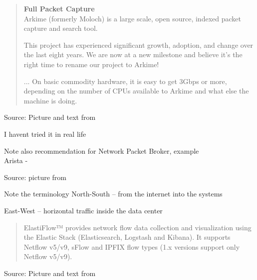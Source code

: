 \documentclass[Screen16to9,17pt]{foils}
\begin{document}


\begin{quote}\small
{\bf Full Packet Capture}\\
Arkime (formerly Moloch) is a large scale, open source, indexed packet capture and search tool.

This project has experienced significant growth, adoption, and change over the last eight years. We are now at a new milestone and believe it’s the right time to rename our project to Arkime!

...
On basic commodity hardware, it is easy to get 3Gbps or more, depending on the number of CPUs available to Arkime and what else the machine is doing.
\end{quote}
Source: Picture and text from 

\begin{list2}
\item I havent tried it in real life
\item Note also recommendation for Network Packet Broker, example\\
Arista - 
\end{list2}





Source: picture from 

\begin{list2}
\item Note the terminology North-South -- from the internet into the systems
\item East-West -- horizontal traffic inside the data center
\end{list2}





\begin{quote}
  ElastiFlow™ provides network flow data collection and visualization using the Elastic Stack (Elasticsearch, Logstash and Kibana). It supports Netflow v5/v9, sFlow and IPFIX flow types (1.x versions support only Netflow v5/v9).
\end{quote}
Source: Picture and text from 
\end{document}

